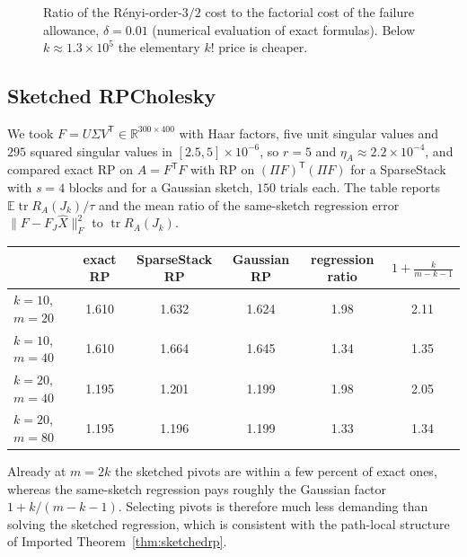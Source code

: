 \documentclass[11pt,a4paper]{article}
\theoremstyle{definition}
\theoremstyle{remark}
\newcommand{\E}{\mathbb E}
\newcommand{\R}{\mathbb R}
\newcommand{\tr}{\operatorname{tr}}
\newcommand{\norm}[1]{\lVert#1\rVert}
\newcommand{\1}{\mathbf 1}
\newcommand{\T}{\mathsf T}
\begin{document}
\begin{figure}[ht]
\centering
{}
\caption{Ratio of the R\'enyi-order-$3/2$ cost to the factorial cost of
the failure allowance, $\delta=0.01$ (numerical evaluation of exact
formulas). Below $k\approx1.3\times10^5$ the elementary $k!$ price is
cheaper.}
\label{fig:price}
\end{figure}

\subsection{Sketched RPCholesky}\label{sec:num-sketchedrp}
We took $F=U\Sigma V^\T\in\R^{300\times400}$ with Haar factors, five
unit singular values and $295$ squared singular values in
$[2.5,5]\times10^{-6}$, so $r=5$ and $\eta_A\approx2.2\times10^{-4}$, and
compared exact RP on $A=F^\T F$ with RP on $(\Pi F)^\T(\Pi F)$ for a
SparseStack with $s=4$ blocks and for a Gaussian sketch, $150$ trials
each. The table reports $\E\tr R_A(J_k)/\tau$ and the mean ratio of the
same-sketch regression error $\norm{F-F_J\widehat X}_F^2$ to $\tr R_A(J_k)$.
\begin{center}\small
\begin{tabular}{lccccc}
\toprule
& exact RP & SparseStack RP & Gaussian RP & regression ratio & $1+\frac k{m-k-1}$\\
\midrule
$k=10$, $m=20$ & 1.610 & 1.632 & 1.624 & 1.98 & 2.11\\
$k=10$, $m=40$ & 1.610 & 1.664 & 1.645 & 1.34 & 1.35\\
$k=20$, $m=40$ & 1.195 & 1.201 & 1.199 & 1.98 & 2.05\\
$k=20$, $m=80$ & 1.195 & 1.196 & 1.199 & 1.33 & 1.34\\
\bottomrule
\end{tabular}
\end{center}
Already at $m=2k$ the sketched pivots are within a few percent of exact
ones, whereas the same-sketch regression pays roughly the
Gaussian factor $1+k/(m-k-1)$. Selecting pivots is therefore much less
demanding than solving the sketched regression, which is consistent with
the path-local structure of Imported Theorem~\ref{thm:sketchedrp}.
\end{document}
